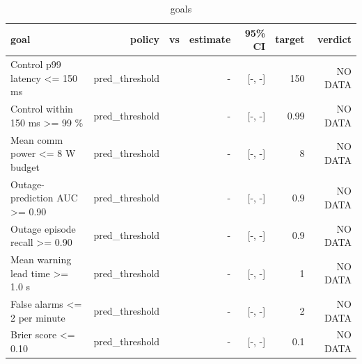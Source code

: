 \begin{table}[t]\centering\small
\begin{tabular}{lrrrrrr}\toprule
goal & policy & vs & estimate & 95\% CI & target & verdict \\\midrule
Control p99 latency <= 150 ms & pred\_threshold &  & - & [-, -] & 150 & NO DATA \\
Control within 150 ms >= 99 \% & pred\_threshold &  & - & [-, -] & 0.99 & NO DATA \\
Mean comm power <= 8 W budget & pred\_threshold &  & - & [-, -] & 8 & NO DATA \\
Outage-prediction AUC >= 0.90 & pred\_threshold &  & - & [-, -] & 0.9 & NO DATA \\
Outage episode recall >= 0.90 & pred\_threshold &  & - & [-, -] & 0.9 & NO DATA \\
Mean warning lead time >= 1.0 s & pred\_threshold &  & - & [-, -] & 1 & NO DATA \\
False alarms <= 2 per minute & pred\_threshold &  & - & [-, -] & 2 & NO DATA \\
Brier score <= 0.10 & pred\_threshold &  & - & [-, -] & 0.1 & NO DATA \\
\bottomrule\end{tabular}\caption{goals}\end{table}
